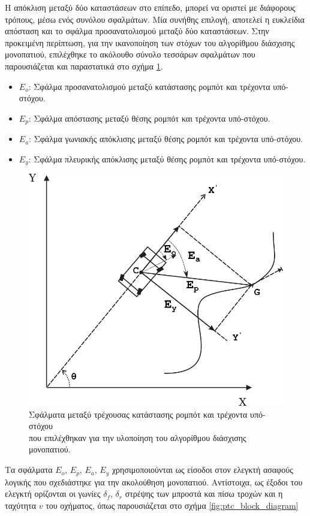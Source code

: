 \bigskip
Η απόκλιση μεταξύ δύο καταστάσεων στο επίπεδο, μπορεί να οριστεί με διάφορους τρόπους, μέσω ενός συνόλου σφαλμάτων. Μία συνήθης επιλογή, αποτελεί η ευκλείδια απόσταση και το σφάλμα προσανατολισμού μεταξύ δύο καταστάσεων. Στην προκειμένη περίπτωση, για την ικανοποίηση των στόχων του αλγορίθμου διάσχισης μονοπατιού, επιλέχθηκε το ακόλουθο σύνολο τεσσάρων σφαλμάτων που παρουσιάζεται και παραστατικά στο σχήμα \ref{fig:ptc_errors}.

\begin{itemize}
	\item \textbf{$E_o$}:\; Σφάλμα προσανατολισμού μεταξύ κατάστασης ρομπότ και τρέχοντα υπό-στόχου.
	\item \textbf{$E_p$}:\; Σφάλμα απόστασης μεταξύ θέσης ρομπότ και τρέχοντα υπό-στόχου.
	\item \textbf{$E_{a}$}:\; Σφάλμα γωνιακής απόκλισης μεταξύ θέσης ρομπότ και τρέχοντα υπό-στόχου.
	\item \textbf{$E_y$}:\; Σφάλμα πλευρικής απόκλισης μεταξύ θέσης ρομπότ και τρέχοντα υπό-στόχου.
\end{itemize}

\begin{figure}[!ht]
	\centering
	\includegraphics[width=0.5\linewidth]{Chapters/Chapter3/Figures/ptc_errors.png}
	\caption{Σφάλματα μεταξύ τρέχουσας κατάστασης ρομπότ και τρέχοντα υπό-στόχου\\ που επιλέχθηκαν για την υλοποίηση του αλγορίθμου διάσχισης μονοπατιού.}
	\label{fig:ptc_errors}
\end{figure}

\bigskip
Τα σφάλματα $E_o$, $E_p$, $E_a$, $E_y$ χρησιμοποιούνται ως είσοδοι στον ελεγκτή ασαφούς λογικής που σχεδιάστηκε για την ακολούθηση μονοπατιού. Αντίστοιχα, ως έξοδοι του ελεγκτή ορίζονται οι γωνίες $\delta_f$, $\delta_r$ στρέψης των μπροστά και πίσω τροχών και η ταχύτητα $v$ του οχήματος, όπως παρουσιάζεται στο σχήμα \ref{fig:ptc_block_diagram}

